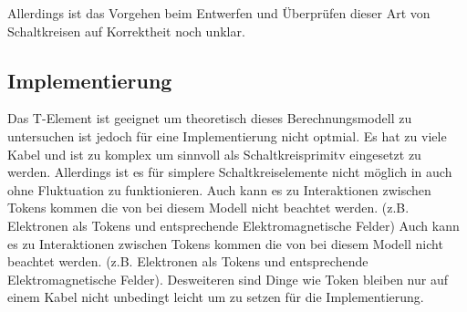 \documentclass[11pt,a4paper]{article}
\begin{document}
%
Allerdings ist das Vorgehen beim Entwerfen und Überprüfen dieser Art von 
Schaltkreisen auf Korrektheit noch unklar. 


\subsection{Implementierung}
Das T-Element ist geeignet um theoretisch dieses Berechnungsmodell zu 
untersuchen ist jedoch für eine Implementierung nicht optmial.
%
Es hat zu viele Kabel und ist zu komplex um sinnvoll als Schaltkreisprimitv
eingesetzt zu werden. 
%
Allerdings ist es für simplere Schaltkreiselemente nicht möglich in auch ohne 
Fluktuation zu funktionieren.
%
Auch kann es zu Interaktionen zwischen Tokens kommen die von bei diesem Modell
nicht beachtet werden. (z.B. Elektronen als Tokens und entsprechende 
Elektromagnetische Felder)
%
Auch kann es zu Interaktionen zwischen Tokens kommen die von bei diesem Modell
nicht beachtet werden. (z.B. Elektronen als Tokens und entsprechende 
Elektromagnetische Felder). Desweiteren sind Dinge wie Token bleiben nur
auf einem Kabel nicht unbedingt leicht um zu setzen für die Implementierung.





\end{document}
